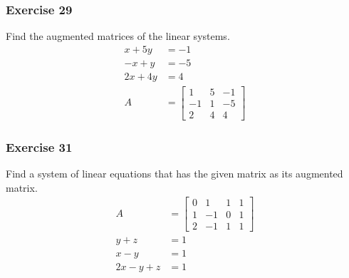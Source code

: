 \documentclass[letterpaper, 12pt]{math}
\begin{document}
\subsubsection*{Exercise 29}
Find the augmented matrices of the linear systems.
\begin{align*}
  x+5y &= -1 \\
  -x+y &= -5 \\
  2x+4y &= 4 \\
  A &= \left[\begin{array}{cc|c}
    1 & 5 & -1 \\
    -1 & 1 & -5 \\
    2 & 4 & 4
  \end{array}\right]
\end{align*}

\subsubsection*{Exercise 31}
Find a system of linear equations that has the given matrix as its augmented
matrix.
\begin{align*}
  A &= \left[\begin{array}{ccc|c}
    0 & 1 & 1 & 1 \\
    1 & -1 & 0 & 1 \\
    2 & -1 & 1 & 1
  \end{array}\right] \\
  y+z &= 1 \\
  x-y &= 1 \\
  2x-y+z &= 1
\end{align*}
\end{document}
